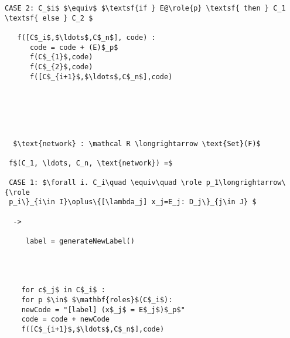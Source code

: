 \begin{lstlisting}[mathescape=true,backgroundcolor={}]
CASE 2: C_$i$ $\equiv$ $\textsf{if } E@\role{p} \textsf{ then } C_1 \textsf{ else } C_2 $

   f([C$_i$,$\ldots$,C$_n$], code) :
      code = code + (E)$_p$
      f(C$_{1}$,code)
      f(C$_{2}$,code)
      f([C$_{i+1}$,$\ldots$,C$_n$],code)
      

      
	
\end{lstlisting}

\newpage

\begin{lstlisting}[mathescape=true,backgroundcolor={}]

  $\text{network} : \mathcal R \longrightarrow \text{Set}(F)$
  
 f$(C_1, \ldots, C_n, \text{network}) =$ 
  
 CASE 1: $\forall i. C_i\quad \equiv\quad \role p_1\longrightarrow\{\role
 p_i\}_{i\in I}\oplus\{[\lambda_j] x_j=E_j: D_j\}_{j\in J} $

  ->
 
     label = generateNewLabel()




    for c$_j$ in C$_i$ :
    for p $\in$ $\mathbf{roles}$(C$_i$):
    newCode = "[label] (x$_j$ = E$_j$)$_p$"
    code = code + newCode
    f([C$_{i+1}$,$\ldots$,C$_n$],code)
 
\end{lstlisting}    


